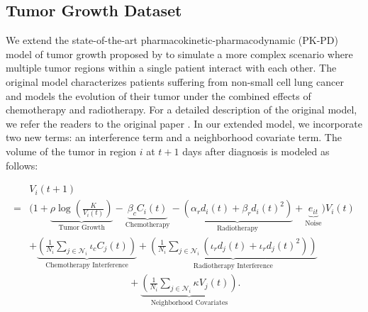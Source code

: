 \subsection{Tumor Growth Dataset}\label{sec:tumor_growh_dataset}
We extend the state-of-the-art pharmacokinetic-pharmacodynamic (PK-PD) model of tumor growth proposed by \cite{geng2017prediction} to simulate a more complex scenario where multiple tumor regions within a single patient interact with each other. The original model characterizes patients suffering from non-small cell lung cancer and models the evolution of their tumor under the combined effects of chemotherapy and radiotherapy. For a detailed description of the original model, we refer the readers to the original paper \cite{geng2017prediction}. In our extended model, we incorporate two new terms: an interference term and a neighborhood covariate term. The volume of the tumor in region \(i\) at \(t+1\) days after diagnosis is modeled as follows:
\begin{small}
\begin{equation}
\begin{aligned}
& V_i(t + 1)  \\
= & \Bigg(1 + \underbrace{\rho \log\left(\frac{K}{V_i(t)}\right)}_{\text{Tumor Growth}} - \underbrace{\beta_c C_i(t)}_{\text{Chemotherapy}} - \underbrace{\left(\alpha_r d_i(t) + \beta_r d_i(t)^2\right)}_{\text{Radiotherapy}} + \underbrace{e_{it}}_{\text{Noise}} \Bigg) V_i(t) \nonumber \\
& + \underbrace{\left(\frac{1}{N_i} \sum_{j \in \mathcal{N}_i} \iota_c C_j(t)\right)}_{\text{Chemotherapy Interference}} + \underbrace{\left(\frac{1}{N_i} \sum_{j \in \mathcal{N}_i} \left(\iota_r d_j(t) + \iota_r d_j(t)^2\right)\right)}_{\text{Radiotherapy Interference}}  \\
&  \qquad \qquad \qquad \qquad \qquad + \underbrace{\left(\frac{1}{N_i} \sum_{j \in \mathcal{N}_i} \kappa V_j(t)\right)}_{\text{Neighborhood Covariates}}.
\end{aligned}
\label{eq:tumor_growth_eq}
\end{equation}    
\end{small}
